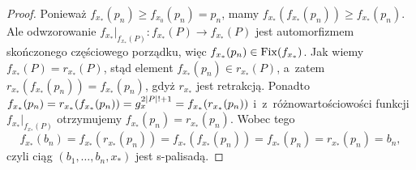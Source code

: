 \begin{proof}
Ponieważ $f_{x_*}(p_n)\geq f_{x_0}(p_n)=p_n$, mamy $f_{x_*}(f_{x_*}(p_n))\geq f_{x_*}(p_n)$. Ale odwzorowanie $f_{x_*}\big|_{f_{x_*}(P)}\colon f_{x_*}(P)\to f_{x_*}(P)$ jest automorfizmem skończonego częściowego porządku, więc $f_{x_*}(p_n)\in\operatorname{Fix}(f_{x_*})$. Jak wiemy $f_{x_*}(P)=r_{x_*}(P)$, stąd element $f_{x_*}(p_n)\in r_{x_*}(P)$, a~zatem $r_{x_*}(f_{x_*}(p_n))=f_{x_*}(p_n)$, gdyż $r_{x_*}$ jest retrakcją. Ponadto $f_{x_*}(p_n)=r_{x_*}(f_{x_*}(p_n))=g_x^{2\left|P\right|!+1}=f_{x_*}(r_{x_*}(p_n))$ i~z~różnowartościowości funkcji $f_{x_*}|_{f_{x_*}(P)}$ otrzymujemy $f_{x_*}(p_n)=r_{x_*}(p_n)$. Wobec tego
\[f_{x_*}(b_n)=f_{x_*}(r_{x_{*}}(p_n))=f_{x_*}(f_{x_*}(p_n))=f_{x_*}(p_n)=r_{x_*}(p_n)=b_n,\]
czyli ciąg $(b_1,\ldots,b_n,x_*)$ jest \mbox{s-palisadą}.
\end{proof}






